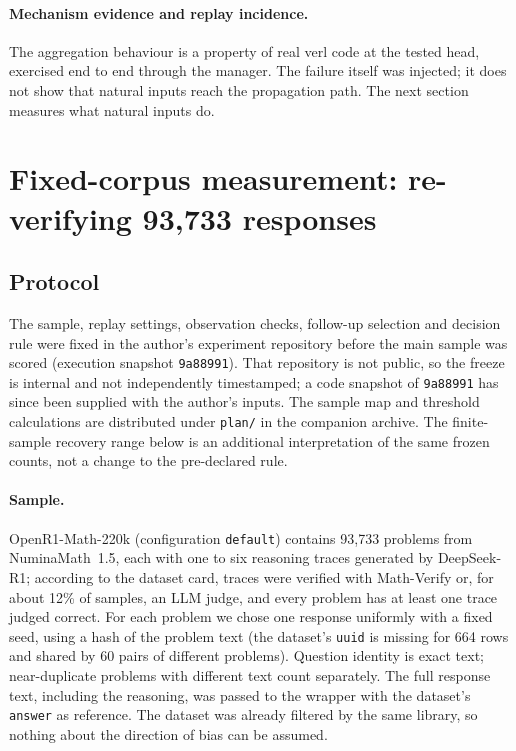 \documentclass[10pt,a4paper]{article}
\let\cite\citep
\newcommand{\mv}{Math-Verify}
\begin{document}
\paragraph{Mechanism evidence and replay incidence.}
The aggregation behaviour is a property of real verl code at the tested head,
exercised end to end through the manager. The failure itself was injected; it
does not show that natural inputs reach the propagation path. The next
section measures what natural inputs do.

\section{Fixed-corpus measurement: re-verifying 93,733 responses}
\label{sec:prevalence}

\subsection{Protocol}

The sample, replay settings, observation checks, follow-up selection and
decision rule were fixed in the author's experiment repository before the main
sample was scored (execution snapshot \texttt{9a88991}). That repository is
not public, so the freeze is internal and not independently timestamped; a
code snapshot of \texttt{9a88991} has since been supplied with the
author's inputs. The sample map and threshold calculations are
distributed under \texttt{plan/} in the companion archive. The finite-sample
recovery range below is an additional interpretation of the same frozen
counts, not a change to the pre-declared rule.

\paragraph{Sample.}
OpenR1-Math-220k \cite{openr1math} (configuration \texttt{default}) contains
93,733 problems from NuminaMath~1.5, each with one to six reasoning traces
generated by DeepSeek-R1; according to the dataset card, traces were verified
with \mv{} or, for about 12\% of samples, an LLM judge, and every problem has
at least one trace judged correct. For each
problem we chose one response uniformly with a fixed seed, using a hash of
the problem text (the dataset's \texttt{uuid} is missing for 664 rows and
shared by 60 pairs of different problems). Question identity is exact text;
near-duplicate problems with different text count separately. The full
response text, including
the reasoning, was passed to the wrapper with the dataset's \texttt{answer}
as reference. The dataset was already filtered by the same library, so
nothing about the direction of bias can be assumed.
\end{document}
